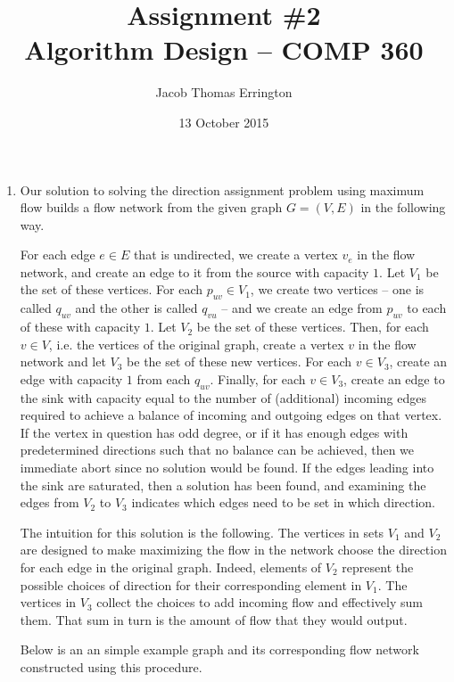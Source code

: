 \documentclass[letterpaper,11pt]{article}
\author{Jacob Thomas Errington}
\title{Assignment \#2 \\ Algorithm Design -- COMP 360}
\date{13 October 2015}
\begin{document}
\maketitle

\begin{enumerate}

    \item Our solution to solving the direction assignment problem using
        maximum flow builds a flow network from the given graph $G = (V, E)$ in
        the following way.

        For each edge $e \in E$ that is undirected, we create a vertex $v_e$
        in the flow network, and create an edge to it from the source with
        capacity $1$. Let $V_1$ be the set of these vertices. For each
        $p_{uv} \in V_1$, we create two vertices -- one is called $q_{uv}$ and
        the other is called $q_{vu}$ -- and we create an edge from $p_{uv}$ to
        each of these with capacity $1$. Let $V_2$ be the set of these
        vertices. Then, for each $v \in V$, i.e. the vertices of the original
        graph, create a vertex $v$ in the flow network and let $V_3$ be the set
        of these new vertices. For each $v \in V_3$, create an edge with
        capacity $1$ from each $q_{uv}$. Finally, for each $v \in V_3$, create
        an edge to the sink with capacity equal to the number of (additional)
        incoming edges required to achieve a balance of incoming and outgoing
        edges on that vertex. If the vertex in question has odd degree, or if
        it has enough edges with predetermined directions such that no balance
        can be achieved, then we immediate abort since no solution would be
        found. If the edges leading into the sink are saturated, then a
        solution has been found, and examining the edges from $V_2$ to $V_3$
        indicates which edges need to be set in which direction.

        The intuition for this solution is the following. The vertices in sets
        $V_1$ and $V_2$ are designed to make maximizing the flow in the network
        choose the direction for each edge in the original graph. Indeed,
        elements of $V_2$ represent the possible choices of direction for their
        corresponding element in $V_1$. The vertices in $V_3$ collect the
        choices to add incoming flow and effectively sum them. That sum in turn
        is the amount of flow that they would output.

        Below is an an simple example graph and its corresponding flow network
        constructed using this procedure.


\end{enumerate}
\end{document}
